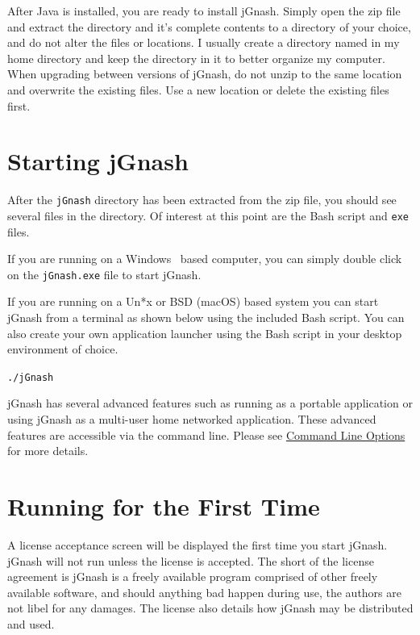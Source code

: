 \documentclass[letterpaper,12pt]{book}
\begin{document}
    After Java is installed, you are ready to install jGnash.
    Simply open the zip file and extract the  directory and it's complete contents to a directory of
    your choice, and do not alter the files or locations.
    I usually create a directory named  in my home directory and keep
    the  directory in it to better organize my computer.
    When upgrading between versions of jGnash, do not unzip to the same location and overwrite the existing files.
    Use a new location or delete the existing files first.

    \section{Starting jGnash}\label{sec:starting-jgnash}

    After the \texttt{jGnash} directory has been extracted from the zip file, you should see several files in the directory.
    Of interest at this point are the Bash script and \texttt{exe} files.

    If you are running on a Windows\texttrademark~ based computer, you can simply double click on the \texttt{jGnash.exe} file to
    start jGnash.

    If you are running on a Un*x or BSD (macOS) based system you can start jGnash from a terminal as shown below using
    the included Bash script.
    You can also create your own application launcher using the Bash script in your desktop environment of choice.

    \begin{mdframed}[style=info]
        \texttt{./jGnash}
    \end{mdframed}

    jGnash has several advanced features such as running as a portable application or using jGnash as a multi-user home
    networked application. These advanced features are accessible via the command line.
    Please see \hyperref[ch:cmdOptions]{Command Line Options} for more details.

    \section{Running for the First Time}\label{sec:running-for-the-first-time}
    A license acceptance screen will be displayed the first time you start jGnash.
    jGnash will not run unless the license is accepted.
    The short of the license agreement is jGnash is a freely available program comprised of other freely available software,
    and should anything bad happen during use, the authors are not libel for any damages.
    The license also details how jGnash may be distributed and used.
\end{document}
